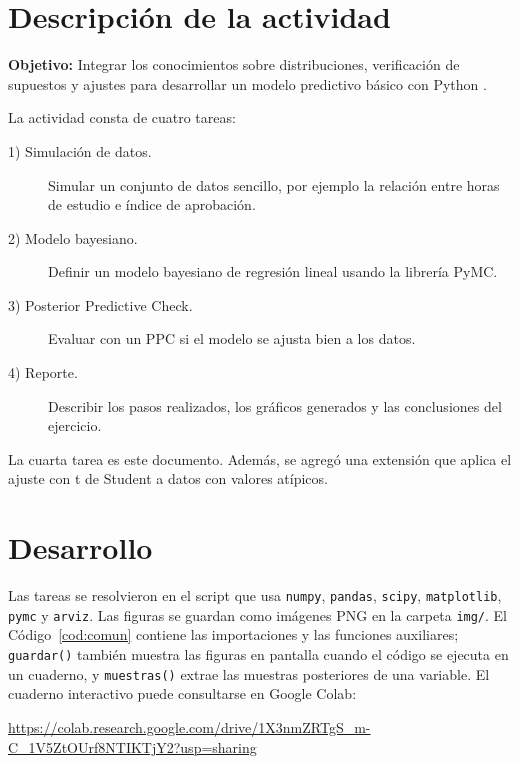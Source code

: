 \documentclass[11pt,letterpaper]{article}
\begin{document}
\section{Descripción de la actividad}

\textbf{Objetivo:} Integrar los conocimientos sobre distribuciones, verificación de supuestos y ajustes para desarrollar un modelo predictivo básico con Python \parencite{tecnm2026_documento_fuente}.

La actividad consta de cuatro tareas:

\begin{description}
    \item[1) Simulación de datos.] Simular un conjunto de datos sencillo, por ejemplo la relación entre horas de estudio e índice de aprobación.
    \item[2) Modelo bayesiano.] Definir un modelo bayesiano de regresión lineal usando la librería PyMC.
    \item[3) Posterior Predictive Check.] Evaluar con un PPC si el modelo se ajusta bien a los datos.
    \item[4) Reporte.] Describir los pasos realizados, los gráficos generados y las conclusiones del ejercicio.
\end{description}

La cuarta tarea es este documento. Además, se agregó una extensión que aplica el ajuste con t de Student a datos con valores atípicos.

\section{Desarrollo}

Las tareas se resolvieron en el script que usa \texttt{numpy}, \texttt{pandas}, \texttt{scipy}, \texttt{matplotlib}, \texttt{pymc} y \texttt{arviz}. Las figuras se guardan como imágenes PNG en la carpeta \texttt{img/}. El Código~\ref{cod:comun} contiene las importaciones y las funciones auxiliares; \texttt{guardar()} también muestra las figuras en pantalla cuando el código se ejecuta en un cuaderno, y \texttt{muestras()} extrae las muestras posteriores de una variable. El cuaderno interactivo puede consultarse en Google Colab:

\begin{center}
    \url{https://colab.research.google.com/drive/1X3nmZRTgS_m-C_1V5ZtOUrf8NTIKTjY2?usp=sharing}
\end{center}
\end{document}
